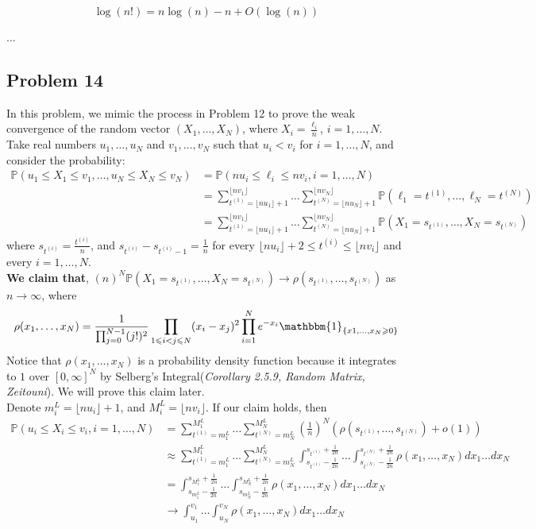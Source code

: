 \documentclass[12pt]{article}
\begin{document}
$$\log(n!) = n\log(n) - n + O(\log(n))$$

...

\subsection*{Problem 14}
In this problem, we mimic the process in Problem 12 to prove the weak convergence of the random vector $(X_{1},\dots,X_{N})$, where $X_{i}=\frac{\ell_{i}}{n}$, $i=1,\dots,N$. Take real numbers $u_{1},\dots, u_{N}$ and $v_{1},\dots, v_{N}$ such that $u_{i}<v_{i}$ for $i=1,\dots, N$, and consider the probability: 
\begin{align*}
\mathbb{P}(u_{1}\leqslant X_{1} \leqslant v_{1}, \dots,  u_{N}\leqslant X_{N} \leqslant v_{N})&=\mathbb{P}(nu_{i}\leqslant \ell_{i} \leqslant nv_{i}, i=1,\dots, N)	\\
&=\sum_{t^{(1)}=\lfloor nu_{1}\rfloor+1}^{\lfloor nv_{1}\rfloor}\dots \sum_{t^{(N)}=\lfloor nu_{N}\rfloor+1}^{\lfloor nv_{N}\rfloor}\mathbb{P}(\ell_{1}=t^{(1)},\dots,\ell_{N}=t^{(N)})\\
&=\sum_{t^{(1)}=\lfloor nu_{1}\rfloor+1}^{\lfloor nv_{1}\rfloor}\dots \sum_{t^{(N)}=\lfloor nu_{N}\rfloor+1}^{\lfloor nv_{N}\rfloor}\mathbb{P}(X_{1}=s_{t^{(1)}},\dots, X_{N}=s_{t^{(N)}})
\end{align*}
where $s_{t^{(i)}}=\frac{t^{(i)}}{n}$, and $s_{t^{(i)}}-s_{t^{(i)}-1}=\frac{1}{n}$ for every $\lfloor nu_{i}\rfloor +2\leqslant t^{(i)}\leqslant \lfloor nv_{i}\rfloor$ and every $i=1,\dots, N$.\\
\textbf{We claim that}, $(n)^{N}\mathbb{P}(X_{1}=s_{t^{(1)}},\dots,X_{N}=s_{t^{(N)}})\rightarrow \rho(s_{t^{(1)}},\dots, s_{t^{(N)}})$ as $n\rightarrow\infty$, where $$\rho(x_1,\dots, x_{N})=\frac{1}{\prod_{j=0}^{N-1}(j!)^{2}}\prod_{1\leqslant i<j\leqslant N}(x_{i}-x_{j})^2\prod_{i=1}^{N}e^{-x_{i}}\mathbbm{1}_{\{x1,\dots, x_{N}\geqslant 0\}}$$ 
Notice that $\rho(x_1,\dots, x_{N})$ is a probability density function because it integrates to $1$ over $[0,\infty]^{N}$ by Selberg's Integral(\emph{Corollary 2.5.9, Random Matrix, Zeitouni}). We will prove this claim later.\\
Denote $m^{L}_{i}=\lfloor nu_{i}\rfloor+1$, and $M^{L}_{i}=\lfloor nv_{i}\rfloor$. If our claim holds, then
\begin{align*}
\mathbb{P}(u_{i}\leqslant X_{i} \leqslant v_{i}, i=1, \dots, N)&=\sum_{t^{(1)}=m_{1}^{L}}^{M_{1}^{L}}\dots\sum_{t^{(N)}=m_{N}^{L}}^{M_{N}^{L}}(\frac{1}{n})^{N}(\rho(s_{t^{(1)}},\dots, s_{t^{(N)}})+o(1))\\
&\approx \sum_{t^{(1)}=m_{1}^{L}}^{M_{1}^{L}}\dots\sum_{t^{(N)}=m_{N}^{L}}^{M_{N}^{L}}\int_{s_{t^{(1)}}-\frac{1}{2n}}^{s_{t^{(1)}}+\frac{1}{2n}}\dots\int_{s_{t^{(N)}}-\frac{1}{2n}}^{s_{t^{(N)}}+\frac{1}{2n}}\rho(x_1,\dots, x_{N})dx_{1}\dots dx_{N}\\
& = \int_{s_{m^{L}_{1}}-\frac{1}{2n}}^{s_{M^{L}_{1}}+\frac{1}{2n}}\dots\int_{s_{m^{L}_{N}}-\frac{1}{2n}}^{s_{M^{L}_{N}}+\frac{1}{2n}}\rho(x_1,\dots, x_{N})dx_{1}\dots dx_{N}\\
& \rightarrow \int_{u_{1}}^{v_{1}}\dots\int_{u_{N}}^{v_{N}}\rho(x_1,\dots, x_{N})dx_{1}\dots dx_{N}
\end{align*}
\end{document}
